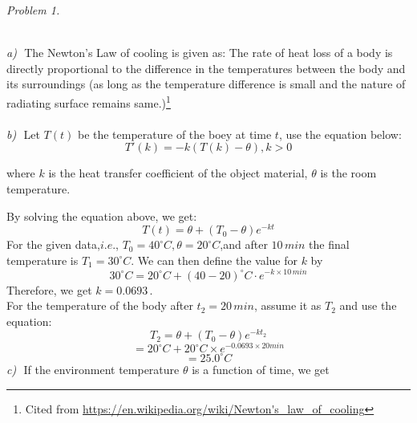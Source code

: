 \documentclass{article}
\begin{document}
\large
\hrulefill

\thispagestyle{empty}

\begin{center}
\begin{large}
\end{large}

\hrulefill

\end{center}
\par
\begin{Large}
\textit{Problem 1.}
\end{Large}
\vspace{0.5em}
\\
\textit{a)}\,\, The Newton's Law of cooling is given as: The rate of heat loss of a body is directly proportional to the difference in the temperatures between the body and its surroundings (as long as the temperature difference is small and the nature of radiating surface remains same.)\footnote{ Cited from \url{ https://en.wikipedia.org/wiki/Newton's_law_of_cooling}}\\~\\
\textit{b)}\,\, Let $T(t)$ be the temperature of the boey at time $t$, use the equation below:
$$T'(k)=-k(T(k)-\theta) , k>0$$
\par where $k$ is the heat transfer coefficient of the object material, $\theta$ is the room temperature.
\par By solving the equation above, we get:
$$T(t)=\theta + (T_0-\theta)e^{-kt}$$
For the given data,$i.e.$, $T_0=40^{\circ}C,\theta=20^{\circ}C$,and after $10\,min$ the final temperature is $T_1=30^{\circ}C$. We can then define the value for $k$ by
$$30^{\circ}C=20^{\circ}C+(40-20)^{\circ}C\cdot e^{-k\times 10\,min}$$
Therefore, we get $k=0.0693$\,.\\
For the temperature of the body after $t_2=20\,min$, assume it as $T_2$ and use the equation:
$$T_2=\theta+(T_0-\theta)e^{-kt_2}$$
$$=20^{\circ}C+20^{\circ}C\times e^{-0.0693\times 20min}$$
$$=25.0^{\circ}C$$
\textit{c)}\,\, If the environment temperature $\theta$ is a function of time, we get
\end{document}
